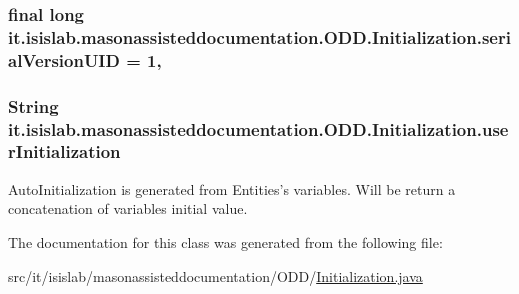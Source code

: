\hypertarget{classit_1_1isislab_1_1masonassisteddocumentation_1_1_o_d_d_1_1_initialization_aa3e836da7dca6c23b732dbdd3557478d}{
\subsubsection[{serial\-Version\-U\-I\-D}]{\setlength{\rightskip}{0pt plus 5cm}final long it.\-isislab.\-masonassisteddocumentation.\-O\-D\-D.\-Initialization.\-serial\-Version\-U\-I\-D = 1\hspace{0.3cm}{\ttfamily [static]}, {\ttfamily [private]}}}\label{classit_1_1isislab_1_1masonassisteddocumentation_1_1_o_d_d_1_1_initialization_aa3e836da7dca6c23b732dbdd3557478d}
\hypertarget{classit_1_1isislab_1_1masonassisteddocumentation_1_1_o_d_d_1_1_initialization_a6b1893c7cd50b5b053020df213f7ec4e}{
\subsubsection[{user\-Initialization}]{\setlength{\rightskip}{0pt plus 5cm}String it.\-isislab.\-masonassisteddocumentation.\-O\-D\-D.\-Initialization.\-user\-Initialization\hspace{0.3cm}{\ttfamily [private]}}}\label{classit_1_1isislab_1_1masonassisteddocumentation_1_1_o_d_d_1_1_initialization_a6b1893c7cd50b5b053020df213f7ec4e}
Auto\-Initialization is generated from Entities's variables. Will be return a concatenation of variables initial value. 

The documentation for this class was generated from the following file\-:\begin{DoxyCompactItemize}
\item 
src/it/isislab/masonassisteddocumentation/\-O\-D\-D/\hyperlink{_initialization_8java}{Initialization.\-java}\end{DoxyCompactItemize}
